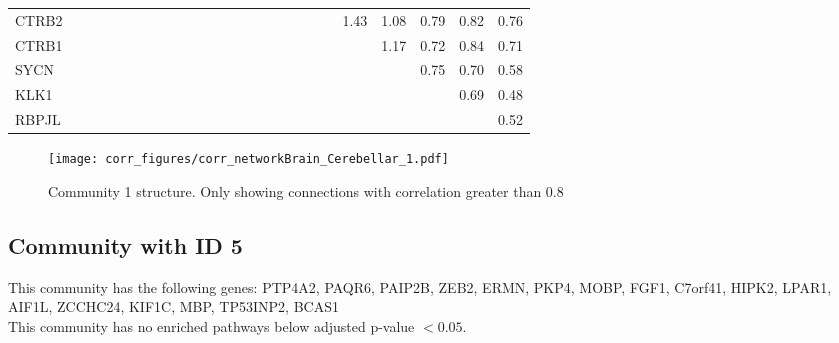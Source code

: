 \begin{longtable}{lrrrrrrrrrrrrrrrrrrrrrrrr}
CTRB2    &              &              &              &             &             &             &             &            &              &            &            &            &             &             &                &           &               &           &             &        1.43 &       1.08 &       0.79 &        0.82 &        0.76 \\
CTRB1    &              &              &              &             &             &             &             &            &              &            &            &            &             &             &                &           &               &           &             &             &       1.17 &       0.72 &        0.84 &        0.71 \\
SYCN     &              &              &              &             &             &             &             &            &              &            &            &            &             &             &                &           &               &           &             &             &            &       0.75 &        0.70 &        0.58 \\
KLK1     &              &              &              &             &             &             &             &            &              &            &            &            &             &             &                &           &               &           &             &             &            &            &        0.69 &        0.48 \\
RBPJL    &              &              &              &             &             &             &             &            &              &            &            &            &             &             &                &           &               &           &             &             &            &            &             &        0.52 \\
\end{longtable}


\begin{figure}[h!]
\centering
\texttt{[image: corr\_figures/corr\_networkBrain\_Cerebellar\_1.pdf]}
\caption{Community 1 structure. Only showing connections with correlation greater than 0.8}
\end{figure}




\subsection*{Community with ID 5}
This community has the following genes: PTP4A2, PAQR6, PAIP2B, ZEB2, ERMN, PKP4, MOBP, FGF1, C7orf41, HIPK2, LPAR1, AIF1L, ZCCHC24, KIF1C, MBP, TP53INP2, BCAS1
\\
This community has no enriched pathways below adjusted p-value $< 0.05$.

